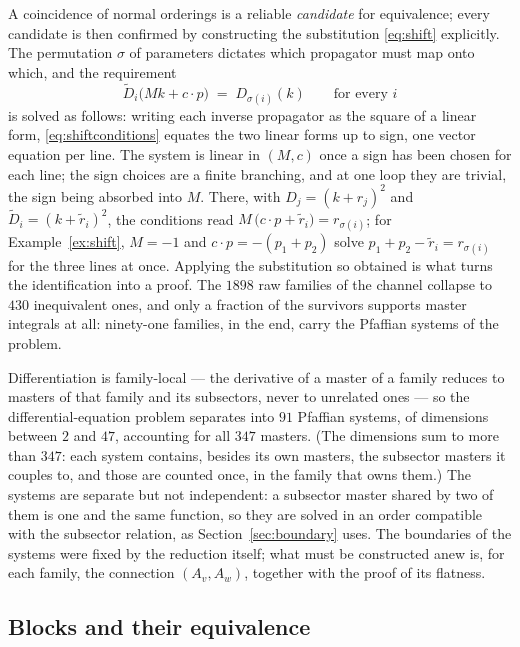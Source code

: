 \documentclass[11pt]{article}
\begin{document}
A coincidence of normal orderings is a reliable \emph{candidate} for
equivalence; every candidate is then confirmed by constructing the
substitution \eqref{eq:shift} explicitly.  The permutation $\sigma$
of parameters dictates which propagator must map onto which, and the
requirement
\begin{equation}
  \widetilde D_i\big(Mk + c\cdot p\big) \;=\; D_{\sigma(i)}(k)
  \qquad \text{for every } i
  \label{eq:shiftconditions}
\end{equation}
is solved as follows: writing each inverse propagator as the square of
a linear form, \eqref{eq:shiftconditions} equates the two linear forms
up to sign, one vector equation per line.  The system is linear in
$(M,c)$ once a sign has been chosen for each line; the sign choices
are a finite branching, and at one loop they are trivial, the sign
being absorbed into $M$.  There, with $D_j = (k+r_j)^2$ and
$\widetilde D_i = (k+\tilde r_i)^2$, the conditions read
$M\,\big(c\!\cdot\!p + \tilde r_i\big) = r_{\sigma(i)}$; for
Example~\ref{ex:shift}, $M = -1$ and $c\!\cdot\!p = -(p_1{+}p_2)$
solve $p_1{+}p_2-\tilde r_i = r_{\sigma(i)}$ for the three lines at
once.
Applying the substitution so obtained is what turns the identification
into a proof.  The $1898$ raw families of the channel collapse to
$430$ inequivalent ones, and only a fraction of the survivors
supports master integrals at all: ninety-one families, in the end,
carry the Pfaffian systems of the problem.

Differentiation is family-local --- the derivative of a master of a
family reduces to masters of that family and its subsectors, never
to unrelated ones --- so the differential-equation problem separates
into $91$ Pfaffian systems, of dimensions between $2$ and $47$,
accounting for all $347$ masters.  (The dimensions sum to more than $347$: each
system contains, besides its own masters, the subsector masters it
couples to, and those are counted once, in the family that owns
them.)  The systems are separate but not independent: a subsector
master shared by two of them is one and the same function, so they
are solved in an order compatible with the subsector relation, as
Section~\ref{sec:boundary} uses.  The boundaries of the systems were
fixed by the reduction itself; what must be constructed anew is, for
each family, the connection $(A_v, A_w)$, together with the proof of
its flatness.

\subsection{Blocks and their equivalence}
\end{document}

